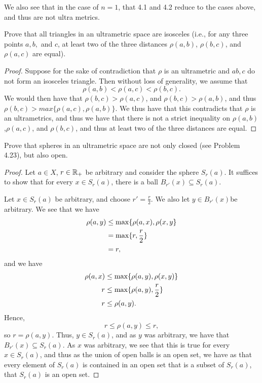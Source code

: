 We also see that in the case of $n=1$, that 4.1 and 4.2 reduce to the
cases above, and thus are not ultra metrics.

\begin{majorEx}%
    Prove that all triangles in an ultrametric space are isosceles (i.e., for
    any three points $a,b,$ and $c$, at least two of the three distances
    $\rho(a,b)$, $\rho(b,c)$, and $\rho(a, c)$ are equal).
\end{majorEx}

\begin{proof}
    Suppose for the sake of contradiction that $\rho$ is an ultrametric and $a
    b, c$ do not form an isosceles triangle. Then without loss of
    generality, we assume that
    \[
        \rho(a,b) < \rho(a,c) < \rho(b,c).
    \]
    We would then have that 
    $\rho(b,c)>\rho(a,c) $, and $\rho(b,c)>\rho(a,b)$, and thus
    $\rho(b,c)> max\{\rho(a,c), \rho(a,b)\}$. We thus have that
    this contradicts that $\rho$ is an ultrametrics, and thus we have
    that there is not a strict inequality on $\rho(a,b)$,$\rho(a,c)$,
    and $\rho(b,c)$, and thus at least two of the three distances 
    are equal.    

\end{proof}

\begin{majorEx}%
    Prove that spheres in an ultrametric space are not only closed (see Problem
    4.23), but also open.
\end{majorEx}

\begin{proof}
    Let $a \in X$, $r \in \mathbb{R}_+$ be arbitrary and consider the sphere $S_r(a)$.
    It suffices to show that for every $x \in S_r(a)$, there is a ball $B_{r'}(x)
    \subseteq S_r(a)$. 

    Let $x \in S_r(a)$ be arbitrary, and choose $r' = \frac{r}{2}$. We
    also let $y\in B_{r'}(x)$be arbitrary. We see that we have
    \begin{align*}
        \rho(a, y) &\leq \max \{\rho(a, x), \rho(x, y\} \\
        &= \max \{r, \frac{r}{2}\} \\
        &= r,
    \end{align*}
    and we have
    \begin{align*}
        \rho(a, x) &\leq \max \{\rho(a, y), \rho(x, y)\} \\
        r &\leq \max \{\rho(a, y), \frac{r}{2}\} \\
        r &\leq \rho(a, y).
    \end{align*}
    Hence,
    \[
        r \leq \rho(a, y) \leq r,
    \]
    so $r = \rho(a, y)$. Thus, $y \in S_{r}(a)$, and as $y$ was
    arbitrary, we have that $B_{r'}(x) \subseteq S_r(a)$. As $x$ was
    arbitrary, we see that this is true for every $x \in S_r(a)$, and
    thus as the union of open balls is an open set, we have as that every
    element of $S_r(a)$ is contained in an open set that is a subset
    of $S_r(a)$, that $S_r(a)$ is an open set.

\end{proof}


